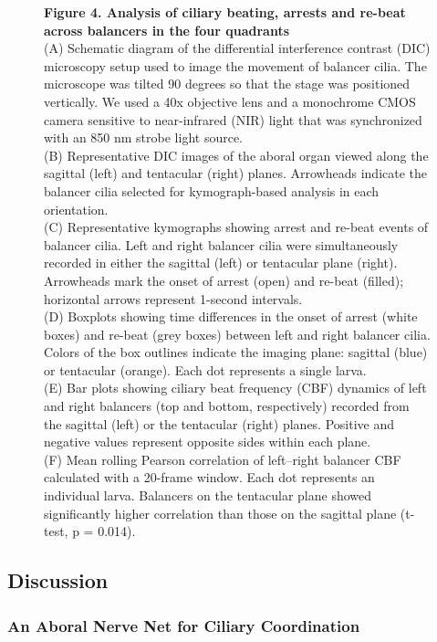 \documentclass[
  11pt,
]{article}
\begin{document}
\begin{figure}[H]
\caption{\textbf{Figure 4. Analysis of ciliary beating, arrests and
re-beat across balancers in the four quadrants}\\
(A) Schematic diagram of the differential interference contrast (DIC)
microscopy setup used to image the movement of balancer cilia. The
microscope was tilted 90 degrees so that the stage was positioned
vertically. We used a 40x objective lens and a monochrome CMOS camera
sensitive to near-infrared (NIR) light that was synchronized with an 850
nm strobe light source.\\
(B) Representative DIC images of the aboral organ viewed along the
sagittal (left) and tentacular (right) planes. Arrowheads indicate the
balancer cilia selected for kymograph-based analysis in each
orientation.\\
(C) Representative kymographs showing arrest and re-beat events of
balancer cilia. Left and right balancer cilia were simultaneously
recorded in either the sagittal (left) or tentacular plane (right).
Arrowheads mark the onset of arrest (open) and re-beat (filled);
horizontal arrows represent 1-second intervals.\\
(D) Boxplots showing time differences in the onset of arrest (white
boxes) and re-beat (grey boxes) between left and right balancer cilia.
Colors of the box outlines indicate the imaging plane: sagittal (blue)
or tentacular (orange). Each dot represents a single larva.\\
(E) Bar plots showing ciliary beat frequency (CBF) dynamics of left and
right balancers (top and bottom, respectively) recorded from the
sagittal (left) or the tentacular (right) planes. Positive and negative
values represent opposite sides within each plane.\\
(F) Mean rolling Pearson correlation of left--right balancer CBF
calculated with a 20-frame window. Each dot represents an individual
larva. Balancers on the tentacular plane showed significantly higher
correlation than those on the sagittal plane (t-test, p = 0.014).}

\end{figure}%

\subsection{Discussion}\label{discussion}

\subsubsection{An Aboral Nerve Net for Ciliary
Coordination}\label{an-aboral-nerve-net-for-ciliary-coordination}
\end{document}
